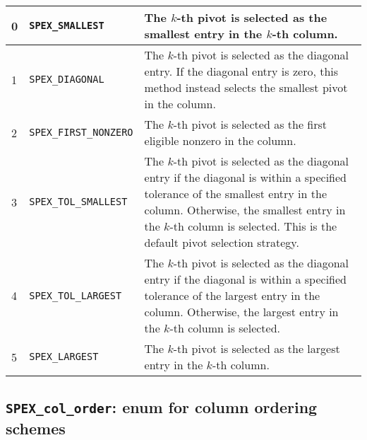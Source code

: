 \documentclass[12pt]{report}
\theoremstyle{definition}
\begin{document}
{\small
\begin{center}
\begin{tabular}{llp{4in}}
\hline
0 & \verb|SPEX_SMALLEST|        & The $k$-th pivot is selected as the smallest
                                  entry in the $k$-th column.\\
\hline
1 & \verb|SPEX_DIAGONAL|        & The $k$-th pivot is selected as the diagonal
                                  entry. If the diagonal entry is zero,
                                  this method instead selects the smallest
                                  pivot in the column.\\
\hline
2 & \verb|SPEX_FIRST_NONZERO|   & The $k$-th pivot is selected as the first
                                  eligible nonzero in the column. \\
\hline
3 & \verb|SPEX_TOL_SMALLEST|    & The $k$-th pivot is selected as the diagonal
                                  entry if the diagonal is within a
                                  specified tolerance of the smallest entry in
                                  the column. Otherwise, the smallest
                                  entry in the $k$-th column is selected.
                                  This is the default pivot selection
                                  strategy. \\
\hline
4 & \verb|SPEX_TOL_LARGEST|     & The $k$-th pivot is selected as the diagonal
                                  entry if the diagonal is within a
                                  specified tolerance of the largest entry in
                                  the column.  Otherwise, the largest
                                  entry in the $k$-th column is selected. \\
\hline
5 & \verb|SPEX_LARGEST|         & The $k$-th pivot is selected as the largest
                                  entry in the $k$-th column. \\
\hline
\end{tabular}
\end{center}
}

\cprotect\subsection{\verb|SPEX_col_order|: enum for column ordering schemes}
\label{ss:SPEX_col_order}
\end{document}
